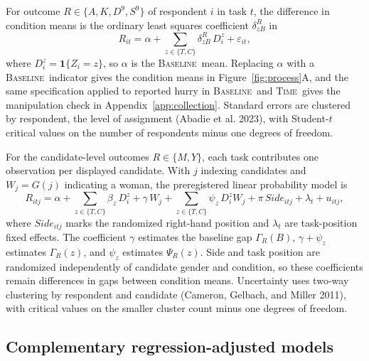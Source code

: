 \documentclass[11pt]{article}\usepackage[]{graphicx}\usepackage[]{xcolor}
\newcommand{\armT}{\textsc{Time}}
\newcommand{\armB}{\textsc{Baseline}}
\begin{document}
For outcome $R\in\{A,K,D^{9},S^{9}\}$ of respondent $i$ in task $t$, the difference in condition means is the ordinary least squares coefficient $\delta^R_{zB}$ in
\begin{equation}
R_{it}=\alpha+\sum_{z\in\{T,C\}}\delta^R_{zB}\,D^z_i+\varepsilon_{it},
\label{eq:dim}
\end{equation}
where $D^z_i=\mathbf 1\{Z_i=z\}$, so $\alpha$ is the \armB\ mean. Replacing $\alpha$ with a \armB\ indicator gives the condition means in Figure~\ref{fig:process}A, and the same specification applied to reported hurry in \armB\ and \armT\ gives the manipulation check in Appendix~\ref{app:collection}. Standard errors are clustered by respondent, the level of assignment (Abadie et al. 2023), with Student-$t$ critical values on the number of respondents minus one degrees of freedom.

For the candidate-level outcomes $R\in\{M,Y\}$, each task contributes one observation per displayed candidate. With $j$ indexing candidates and $W_j=G(j)$ indicating a woman, the preregistered linear probability model is
\begin{equation}
R_{itj}=\alpha+\sum_{z\in\{T,C\}}\beta_z\,D^z_i+\gamma\,W_j+\sum_{z\in\{T,C\}}\psi_z\,D^z_iW_j+\pi\,\mathit{Side}_{itj}+\lambda_t+u_{itj},
\label{eq:lpm}
\end{equation}
where $\mathit{Side}_{itj}$ marks the randomized right-hand position and $\lambda_t$ are task-position fixed effects. The coefficient $\gamma$ estimates the baseline gap $\Gamma_R(B)$, $\gamma+\psi_z$ estimates $\Gamma_R(z)$, and $\psi_z$ estimates $\Psi_R(z)$. Side and task position are randomized independently of candidate gender and condition, so these coefficients remain differences in gaps between condition means. Uncertainty uses two-way clustering by respondent and candidate (Cameron, Gelbach, and Miller 2011), with critical values on the smaller cluster count minus one degrees of freedom.

\subsection{Complementary regression-adjusted models}
\end{document}
